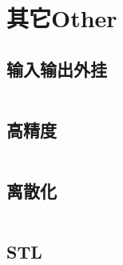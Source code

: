 \documentclass[twoside,sub3section,UTF8]{ctexart}						%
\begin{document}



\newpage
\section{其它Other}
	\subsection{输入输出外挂}
	\inputminted{c++}{"Other/ioadd-on.cpp"}
	\subsection{高精度}
	\inputminted{c++}{"Other/high-precision.cpp"}
	\subsection{离散化}
	\inputminted{c++}{"Other/lisanhua.cpp"}
	\subsection{STL}
	\inputminted{c++}{"Other/STL.cpp"}
\end{document}
